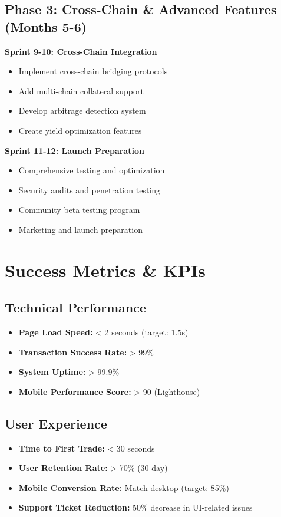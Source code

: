 \documentclass{article}
\begin{document}
\subsection{Phase 3: Cross-Chain \& Advanced Features (Months 5-6)}

\textbf{Sprint 9-10: Cross-Chain Integration}
\begin{itemize}[leftmargin=*]
    \item Implement cross-chain bridging protocols
    \item Add multi-chain collateral support
    \item Develop arbitrage detection system
    \item Create yield optimization features
\end{itemize}

\textbf{Sprint 11-12: Launch Preparation}
\begin{itemize}[leftmargin=*]
    \item Comprehensive testing and optimization
    \item Security audits and penetration testing
    \item Community beta testing program
    \item Marketing and launch preparation
\end{itemize}

\section{Success Metrics \& KPIs}

\subsection{Technical Performance}
\begin{itemize}[leftmargin=*]
    \item \textbf{Page Load Speed:} < 2 seconds (target: 1.5s)
    \item \textbf{Transaction Success Rate:} > 99\%
    \item \textbf{System Uptime:} > 99.9\%
    \item \textbf{Mobile Performance Score:} > 90 (Lighthouse)
\end{itemize}

\subsection{User Experience}
\begin{itemize}[leftmargin=*]
    \item \textbf{Time to First Trade:} < 30 seconds
    \item \textbf{User Retention Rate:} > 70\% (30-day)
    \item \textbf{Mobile Conversion Rate:} Match desktop (target: 85\%)
    \item \textbf{Support Ticket Reduction:} 50\% decrease in UI-related issues
\end{itemize}
\end{document}
